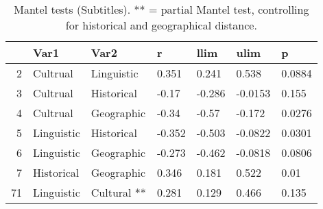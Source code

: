 \begin{table}[ht]
\centering
\begin{tabular}{rllllll}
  \hline
 & Var1 & Var2 & r & llim & ulim & p \\ 
  \hline
2 & Cultrual & Linguistic & 0.351 & 0.241 & 0.538 & 0.0884 \\ 
  3 & Cultrual & Historical & -0.17 & -0.286 & -0.0153 & 0.155 \\ 
  4 & Cultrual & Geographic & -0.34 & -0.57 & -0.172 & 0.0276 \\ 
  5 & Linguistic & Historical & -0.352 & -0.503 & -0.0822 & 0.0301 \\ 
  6 & Linguistic & Geographic & -0.273 & -0.462 & -0.0818 & 0.0806 \\ 
  7 & Historical & Geographic & 0.346 & 0.181 & 0.522 & 0.01 \\ 
  71 & Linguistic & Cultural ** & 0.281 & 0.129 & 0.466 & 0.135 \\ 
   \hline
\end{tabular}
\caption{Mantel tests (Subtitles). ** = partial Mantel test, controlling for historical and geographical distance.} 
\end{table}
